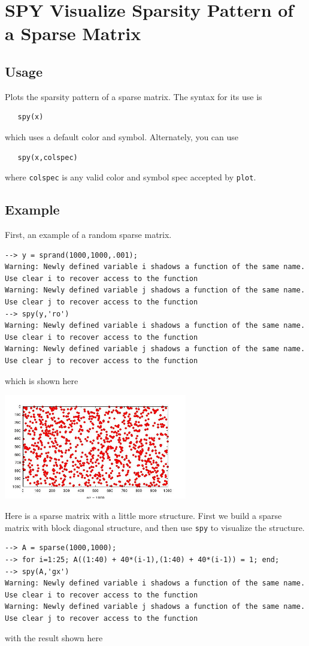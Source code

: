 \section{SPY Visualize Sparsity Pattern of a Sparse Matrix}

\subsection{Usage}

Plots the sparsity pattern of a sparse matrix.  The syntax for its use is
\begin{verbatim}
   spy(x)
\end{verbatim}
which uses a default color and symbol.  Alternately, you can use
\begin{verbatim}
   spy(x,colspec)
\end{verbatim}
where \verb|colspec| is any valid color and symbol spec accepted by \verb|plot|.
\subsection{Example}

First, an example of a random sparse matrix.
\begin{verbatim}
--> y = sprand(1000,1000,.001);
Warning: Newly defined variable i shadows a function of the same name.  Use clear i to recover access to the function
Warning: Newly defined variable j shadows a function of the same name.  Use clear j to recover access to the function
--> spy(y,'ro')
Warning: Newly defined variable i shadows a function of the same name.  Use clear i to recover access to the function
Warning: Newly defined variable j shadows a function of the same name.  Use clear j to recover access to the function
\end{verbatim}
which is shown here


\centerline{\includegraphics[width=8cm]{spy1}}

Here is a sparse matrix with a little more structure.  First we build a 
sparse matrix with block diagonal structure, and then use \verb|spy| to 
visualize the structure.
\begin{verbatim}
--> A = sparse(1000,1000);
--> for i=1:25; A((1:40) + 40*(i-1),(1:40) + 40*(i-1)) = 1; end;
--> spy(A,'gx')
Warning: Newly defined variable i shadows a function of the same name.  Use clear i to recover access to the function
Warning: Newly defined variable j shadows a function of the same name.  Use clear j to recover access to the function
\end{verbatim}
with the result shown here


